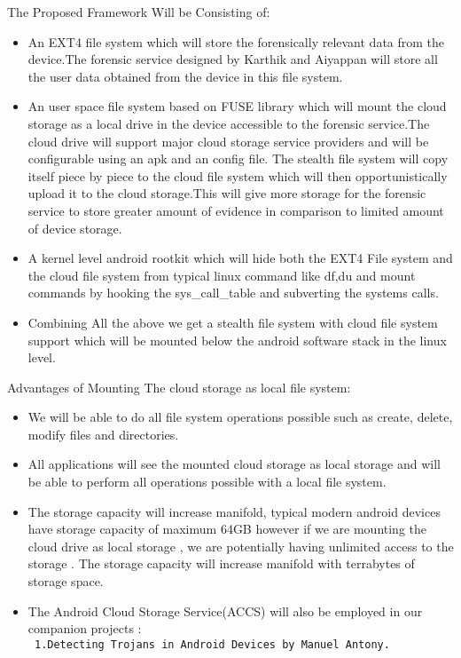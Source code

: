 The Proposed Framework Will be Consisting of:\\
\begin{itemize}
\item An EXT4 file system which will store the forensically relevant data from the device.The forensic service designed by  Karthik \cite{Karthik2016} and Aiyappan \cite{Aiyyappan2015} will store all the user data obtained from the device in this file system.

\item An user space file system based on FUSE library which will mount the cloud storage as a local drive in the device accessible to the forensic service.The cloud drive will support major cloud storage service providers and will be configurable using an apk and an config file. The stealth file system will copy itself piece by piece to the cloud file system which will then opportunistically upload it to the cloud storage.This will give more storage for the forensic service to store greater amount of evidence in comparison to limited amount of device storage.

\item A kernel level android rootkit which will hide both the EXT4 File system and the cloud file system from typical linux command like df,du and mount commands by hooking the sys\_call\_table and subverting the systems calls.

\item Combining All the above we get a stealth file system with cloud file system support which will be mounted below the android software stack in the linux level.
 
\end{itemize}
\bigskip

Advantages of Mounting The cloud storage as local file system:
\begin{itemize}
\item We will be able to do all file system operations possible such as create, delete, modify files and directories.
\item All applications will see the mounted cloud storage as local storage and will be able to perform all operations possible with a local file system.
\item The storage capacity will increase manifold, typical modern android devices have storage capacity of maximum 64GB however if we are mounting the cloud drive as local storage , we are potentially having unlimited access to the storage . The storage capacity will increase manifold with terrabytes of storage space.
\item The Android Cloud Storage Service(ACCS) will also be employed in our companion projects :\\
\tt 
1.Detecting Trojans in Android Devices by Manuel Antony.\\
\tt 

\end{itemize}

